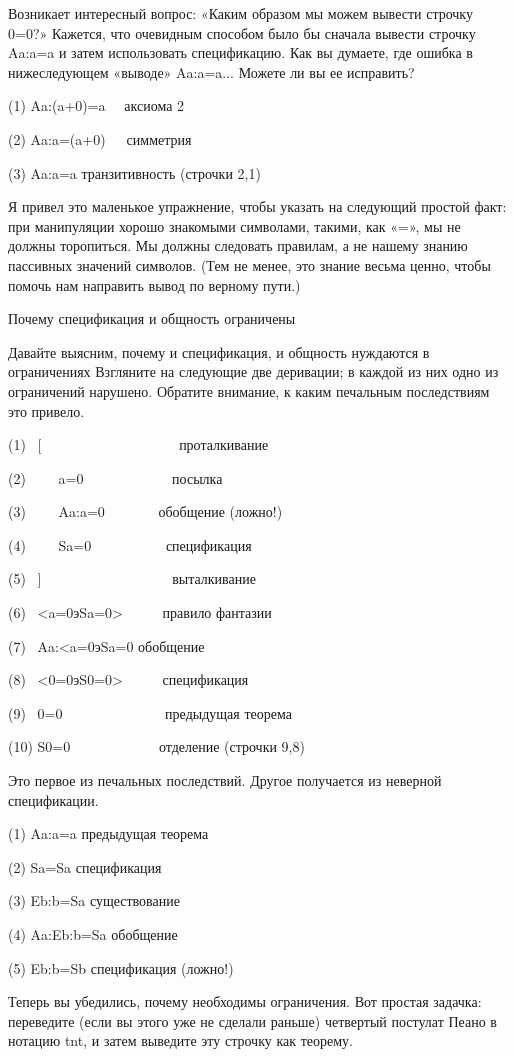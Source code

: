 \documentclass[../main.tex]{subfiles}
\begin{document}
Возникает интересный вопрос: «Каким образом мы можем вывести строчку 0=0?» Кажется, что очевидным способом было бы сначала вывести строчку Aa:a=a и затем использовать спецификацию. Как вы думаете, где ошибка в нижеследующем «выводе» Aa:a=a... Можете ли вы ее исправить?

(1) Aa:(a+0)=a ~~аксиома 2

(2) Aa:a=(a+0)~~~симметрия

(3) Aa:a=a транзитивность (строчки 2,1)

Я привел это маленькое упражнение, чтобы указать на следующий простой факт: при манипуляции хорошо знакомыми символами, такими, как «=», мы не должны торопиться. Мы должны следовать правилам, а не нашему знанию пассивных значений символов. (Тем не менее, это знание весьма ценно, чтобы помочь нам направить вывод по верному пути.)

Почему спецификация и общность ограничены

Давайте выясним, почему и спецификация, и общность нуждаются в ограничениях Взгляните на следующие две деривации; в каждой из них одно из ограничений нарушено. Обратите внимание, к каким печальным последствиям это привело.

(1)~ {[}~~~~~~~~~~~~~~~~~~~ проталкивание

(2)~~~~ a=0~~~~~~~~~~~~ посылка

(3)~~~~ Aa:a=0~~~~~~~ обобщение (ложно!)

(4)~~~~ Sa=0~~~~~~~~~~ спецификация

(5)~ {]}~~~~~~~~~~~~~~~~~~ выталкивание

(6)~ \textless a=0эSa=0\textgreater~~~~~ правило фантазии

(7)~ Aa:\textless a=0эSa=0 обобщение

(8)~ \textless0=0эS0=0\textgreater~~~~~ спецификация

(9)~ 0=0~~~~~~~~~~~~~~ предыдущая теорема

(10) S0=0~~~~~~~~~~~~ отделение (строчки 9,8)

Это первое из печальных последствий. Другое получается из неверной спецификации.

(1) Aa:a=a предыдущая теорема

(2) Sa=Sa спецификация

(3) Eb:b=Sa существование

(4) Aa:Eb:b=Sa обобщение

(5) Eb:b=Sb спецификация (ложно!)

Теперь вы убедились, почему необходимы ограничения. Вот простая задачка: переведите (если вы этого уже не сделали раньше) четвертый постулат Пеано в нотацию \acs{tnt}, и затем выведите эту строчку как теорему.
\end{document}
